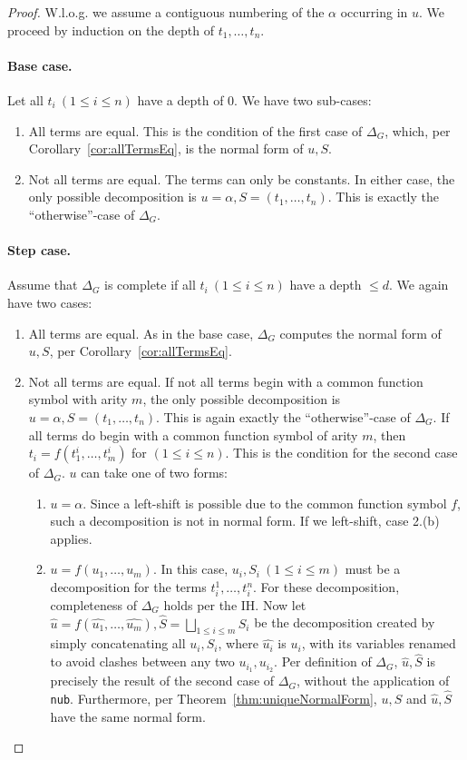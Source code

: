 \documentclass[a4paper, 11pt]{report}
\begin{document}
\begin{proof}
  W.l.o.g. we assume a contiguous numbering of the $\alpha$ occurring in $u$.
  We proceed by induction on the depth of $t_1,\dots,t_n$.

  \paragraph{Base case.} Let all $t_i\ (1 \leq i \leq n)$ have a depth of 0. We have two sub-cases:
  \begin{enumerate}
    \item All terms are equal. This is the condition of the first case of $\Delta_G$, which, per Corollary~\ref{cor:allTermsEq}, is the normal form of $u,S$.
    \item Not all terms are equal. The terms can only be constants. In either case, the only possible decomposition is $u=\alpha, S=(t_1,\dots,t_n)$. This is exactly the ``otherwise''-case of $\Delta_G$.
  \end{enumerate}

  \paragraph{Step case.} Assume that $\Delta_G$ is complete if all $t_i\ (1 \leq i \leq n)$ have a depth $\leq d$.
  We again have two cases:
  \begin{enumerate}
    \item All terms are equal. As in the base case, $\Delta_G$ computes the normal form of $u,S$, per Corollary~\ref{cor:allTermsEq}.
    \item Not all terms are equal. If not all terms begin with a common function symbol with arity $m$, the only possible decomposition is $u=\alpha, S=(t_1,\dots,t_n)$. This is again exactly the ``otherwise''-case of $\Delta_G$.
    If all terms do begin with a common function symbol of arity $m$, then $t_i = f(t_1^i,\dots,t_m^i)$ for  $(1 \leq i \leq n)$. This is the condition for the second case of $\Delta_G$. $u$ can take one of two forms:
    \begin{enumerate}
      \item $u=\alpha$. Since a left-shift is possible due to the common function symbol $f$, such a decomposition is not in normal form. If we left-shift, case 2.(b) applies.
      \item $u=f(u_1,\dots,u_m)$. In this case, $u_i, S_i\ (1 \leq i \leq m)$ must be a decomposition for the terms $t_i^1,\dots,t_i^n$. For these decomposition, completeness of $\Delta_G$ holds per the IH. Now let $\widehat{u}=f(\widehat{u_1},\dots,\widehat{u_m}),\widehat{S}=\bigsqcup\limits_{1 \leq i \leq m} S_i$ be the decomposition created by simply concatenating all $u_i,S_i$, where $\widehat{u_i}$ is $u_i$, with its variables renamed to avoid clashes between any two $u_{i_1}, u_{i_2}$. Per definition of $\Delta_G$, $\widehat{u},\widehat{S}$ is precisely the result of the second case of $\Delta_G$, without the application of \texttt{nub}. Furthermore, per Theorem~\ref{thm:uniqueNormalForm}, $u,S$ and $\widehat{u},\widehat{S}$ have the same normal form.\\


\end{enumerate}
\end{enumerate}
\end{proof}
\end{document}
